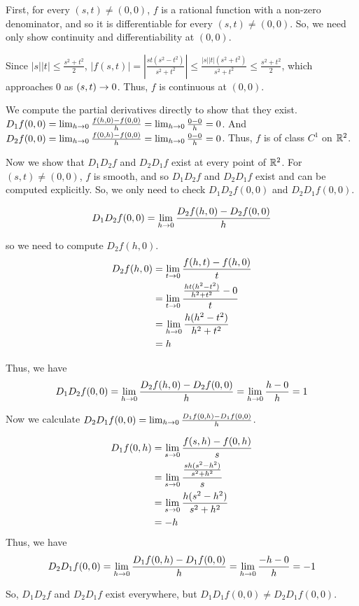 \documentclass{hmwk}
\begin{document}
\begin{solution}

\pre First, for every $(s, t) \neq (0, 0)$, $f$ is a rational function with a non-zero denominator, and so it is differentiable for every $(s, t) \neq (0, 0)$. So, we need only show continuity and differentiability at $(0, 0)$.

\pre Since $|s||t| \leq \frac{s^2 + t^2}{2}$, $|f(s, t)| = \left|\frac{st(s^2 - t^2)}{s^2 + t^2}\right| \leq \frac{|s||t|(s^2 + t^2)}{s^2 + t^2} \leq \frac{s^2 + t^2}{2}$, which approaches 0 as $(s, t) \rightarrow 0$. Thus, $f$ is continuous at $(0, 0)$. 

\pre We compute the partial derivatives directly to show that they exist. $D_1f(0, 0) = \lim_{h \rightarrow 0}\frac{f(h, 0) - f(0, 0)}{h} = \lim_{h \rightarrow 0 }\frac{0 - 0}{h} = 0$. And $D_2f(0, 0) = \lim_{h \rightarrow 0}\frac{f(0, h) - f(0, 0)}{h} = \lim_{h \rightarrow 0 }\frac{0 - 0}{h} = 0$. Thus, $f$ is of class $C^1$ on $\mathbb{R}^2$. 

\pre Now we show that $D_1D_2f$ and $D_2D_1f$ exist at every point of $\mathbb{R}^2$. For $(s, t) \neq (0, 0)$, $f$ is smooth, and so $D_1D_2f$ and $D_2D_1f$ exist and can be computed explicitly. So, we only need to check $D_1D_2f(0, 0)$ and $D_2D_1f(0, 0)$. 

$$D_1D_2f(0, 0) = \lim_{h \rightarrow 0}\frac{D_2f(h, 0) - D_2f(0, 0)}{h}$$

\pre so we need to compute $D_2f(h, 0)$.
\begin{align*}
    D_2f(h, 0) &= \lim_{t \rightarrow 0}\frac{f(h, t) - f(h, 0)}{t} \\
    &= \lim_{t \rightarrow 0}\frac{\frac{ht(h^2 - t^2)}{h^2+t^2} - 0}{t} \\
    &= \lim_{h \rightarrow 0}\frac{h(h^2 - t^2)}{h^2 + t^2} \\
    &= h
\end{align*} 

\pre Thus, we have $$D_1D_2f(0, 0) = \lim_{h \rightarrow 0} \frac{D_2f(h, 0) - D_2f(0, 0)}{h} = \lim_{h \rightarrow 0 }\frac{h - 0}{h} = 1$$

\pre Now we calculate $D_2D_1f(0, 0) = \lim_{h \rightarrow 0}\frac{D_1f(0, h) - D_1f(0, 0)}{h}$.

\begin{align*}
    D_1f(0, h) &= \lim_{s \rightarrow 0}\frac{f(s, h) - f(0, h)}{s} \\
    &= \lim_{s \rightarrow 0}\frac{\frac{sh(s^2 - h^2)}{s^2 + h^2}}{s} \\
    &= \lim_{s \rightarrow 0}\frac{h(s^2 - h^2)}{s^2 + h^2} \\
    &= -h
\end{align*}
\pre Thus, we have $$D_2D_1f(0, 0) = \lim_{h \rightarrow 0}\frac{D_1f(0, h) - D_1f(0, 0)}{h} = \lim_{h \rightarrow 0}\frac{-h - 0}{h} = -1$$

\pre So, $D_1D_2f$ and $D_2D_1f$ exist everywhere, but $D_1D_1f(0, 0) \neq D_2D_1f(0, 0)$.
\end{solution}
\end{document}
